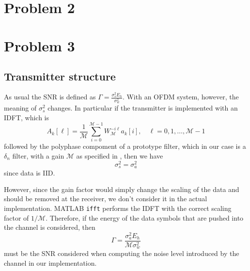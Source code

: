 \documentclass[10pt]{article}
\newcommand{\ofdM} {\mathcal{M}}
\begin{document}

\section*{Problem 2}

\section*{Problem 3}

\subsection*{Transmitter structure}

As usual the SNR is defined as $\Gamma = \frac{\sigma_s^2 E_h}{\sigma_w^2}$. With an OFDM system, however, the meaning of $\sigma_s^2$ changes. In particular if the transmitter is implemented with an IDFT, which is
\begin{equation}
	A_k[\ell] = \frac{1}{\ofdM} \sum_{i = 0}^{\ofdM - 1} W_{\ofdM}^{-i\ell} a_k[i], \quad \ell = 0, 1, \dots, \ofdM-1
\end{equation}
followed by the polyphase compoment of a prototype filter, which in our case is a $\delta_n$ filter, with a gain $\ofdM$ as specified in \cite{bc}, then we have 
\begin{equation}
	\sigma_s^2 = \sigma_a^2
\end{equation}
since data is IID. 

However, since the gain factor would simply change the scaling of the data and should be removed at the receiver, we don't consider it in the actual implementation. MATLAB \texttt{ifft} performs the IDFT with the correct scaling factor of $1/\ofdM$. Therefore, if the energy of the data symbols that are pushed into the channel is considered, then
\begin{equation}
	\Gamma = \frac{\sigma_a^2 E_h}{\ofdM \sigma_w^2}
\end{equation}
must be the SNR considered when computing the noise level introduced by the channel in our implementation.
\end{document}
